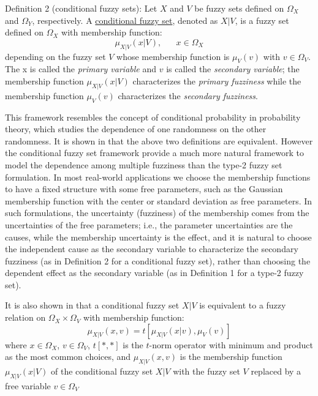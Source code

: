 \documentclass[journal]{IEEEtran}
\begin{document}
Definition 2 (conditional fuzzy sets): Let $X$ and $V$ be fuzzy sets defined on $\Omega_X$ and $\Omega_Y$, respectively. A \uline{conditional fuzzy set}, denoted as $X|V$, is a fuzzy set defined on $\Omega_X$ with membership function:
\begin{equation}
\mu_{X|V}(x|V),\;\;\;\;\;\;x\in\Omega_X
\end{equation}
depending on the fuzzy set $V$ whose membership function is $\mu_V(v)$ with $v\in\Omega_V$. The x is called the \emph{primary variable} and $v$ is called the \emph{secondary variable}; the membership function $\mu_{X|V}(x|V)$ characterizes the \emph{primary fuzziness} while the membership function $\mu_V(v)$ characterizes the \emph{secondary fuzziness}.

This framework resembles the concept of conditional probability in probability theory, which studies the dependence of one randomness on the other randomness. It is shown in \cite{wang_new_2016} that the above two definitions are equivalent. However the conditional fuzzy set framework provide a much more natural framework to model the dependence among multiple fuzziness than the type-2 fuzzy set formulation.
In most real-world applications we choose the membership functions to have a fixed structure with some free parameters, such as the Gaussian membership function with the center or standard deviation as free parameters. In such formulations, the uncertainty (fuzziness) of the membership comes from the uncertainties of the free parameters; i.e., the parameter uncertainties are the causes, while the membership uncertainty is the effect, and it is natural to choose the independent cause as the secondary variable to characterize the secondary fuzziness (as in Definition 2 for a conditional fuzzy set), rather than choosing the dependent effect as the secondary variable (as in Definition 1 for a type-2 fuzzy set).

It is also shown in\cite{wang_new_2016} that a conditional fuzzy set $X|V$ is equivalent to a fuzzy relation on $\Omega_X\times\Omega_V$ with membership function:
\label{fuzzy_relation}
\begin{equation}
\mu_{X|V}(x,v)=t[\mu_{X|V}(x|v),\mu_V(v)]
\end{equation}
where $x\in\Omega_X$, $v\in\Omega_V$, $t[*,*]$ is the $t$-norm operator with minimum and product as the most common choices, and $\mu_{X|V}(x,v)$ is the membership function $\mu_{X|V}(x|V)$ of the conditional fuzzy set $X|V$ with the fuzzy set $V$  replaced by a free variable $v\in\Omega_V$
\end{document}
